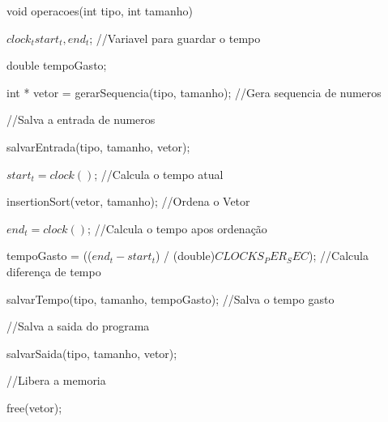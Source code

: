 void operacoes(int tipo, int tamanho) {

		

	$clock_t start_t, end_t$; //Variavel para guardar o tempo
	

	double tempoGasto; 

	

	int * vetor = gerarSequencia(tipo, tamanho); //Gera sequencia de numeros

	

	//Salva a entrada de numeros

	
	salvarEntrada(tipo, tamanho, vetor);

	

	$start_t = clock()$; //Calcula o tempo atual

	
	insertionSort(vetor, tamanho); //Ordena o Vetor

	
	$end_t = clock()$;  //Calcula o tempo apos ordenação

	
	

	

	tempoGasto = (($end_t - start_t$) / (double)$CLOCKS_PER_SEC$); //Calcula diferença de tempo
	

	salvarTempo(tipo, tamanho, tempoGasto); //Salva o tempo gasto

	

	//Salva a saida do programa

	
	salvarSaida(tipo, tamanho, vetor);

	

	//Libera a memoria

	
	free(vetor);

}

